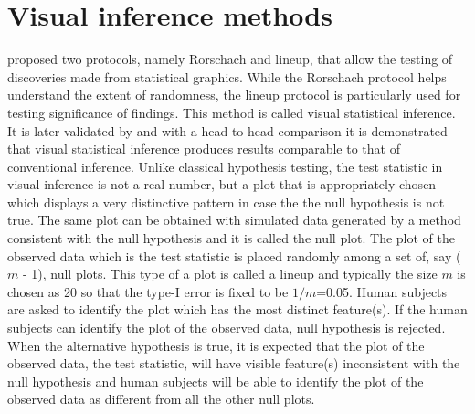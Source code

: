 %
%
%
%
%
%

\section{Visual inference methods} \label{sec:inference}

\cite{buja:2009} proposed two protocols, namely Rorschach and lineup,  that allow the testing of discoveries made from statistical graphics. While the Rorschach protocol helps understand the extent of randomness, the lineup protocol is particularly used for testing significance of findings. This method is called visual statistical inference. It is later validated by \cite{majumder:2011} and with a head to head comparison it is demonstrated that visual statistical inference produces results comparable to that of conventional inference. Unlike classical hypothesis testing, the test statistic in visual inference is not a real number, but a plot that is appropriately chosen which displays a very distinctive pattern in case the the null hypothesis is not true. The same plot can be obtained with simulated data generated by a method consistent with the null hypothesis and it is called the null plot. The plot of the observed data which is the test statistic is placed randomly among a set of, say ($m$ - 1), null plots. This type of a plot is called a lineup and typically the size $m$ is chosen as 20 so that the type-I error is fixed to be $1/m$=0.05. Human subjects are asked to identify the plot which has the most distinct feature(s). If the human subjects can identify the plot of the observed data, null hypothesis is rejected. When the alternative hypothesis is true, it is expected that the plot of the observed data, the test statistic, will have visible feature(s) inconsistent with the null hypothesis and human subjects will be able to identify the plot of the observed data as different from all the other null plots. 

